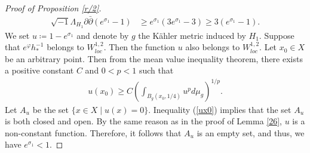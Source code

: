 \documentclass[12pt]{article}
\theoremstyle{definition}
\def\refe{\ast}
\def\inum{{\sqrt{-1}}}
\begin{document}
\begin{proof}[Proof of Proposition \ref{r/2}]
\begin{align}
\inum\Lambda_{H_1}\partial \bar{\partial} (e^{\sigma_1}-1)&\geq e^{\sigma_1}(3e^{\sigma_1}-3) \geq 3(e^{\sigma_1}-1).
\end{align}
We set $u\coloneqq 1-e^{\sigma_1}$ and denote by $g$ the K\"ahler metric induced by $H_1$. Suppose that $e^{\varphi}h_\refe^{-1}$ belongs to $W^{1,2}_{loc}$. Then the function $u$ also belongs to $W^{1,2}_{loc}$. Let $x_0 \in X$ be an arbitrary point. Then from the mean value inequality theorem, there exists a positive constant $C$ and $0<p<1$ such that
\begin{align}
u(x_0)\geq C\left(\int_{B_g(x_0,1/4)}u^pd\mu_g\right)^{1/p}. \label{ux0}
\end{align}
Let $A_u$ be the set $\{x\in X\mid u(x)=0\}$. Inequality (\ref{ux0}) implies that the set $A_u$ is both closed and open. By the same reason as in the proof of Lemma \ref{26}, $u$ is a non-constant function. Therefore, it follows that $A_u$ is an empty set, and thus, we have $e^{\sigma_1}<1$. 
\end{proof}
\end{document}
